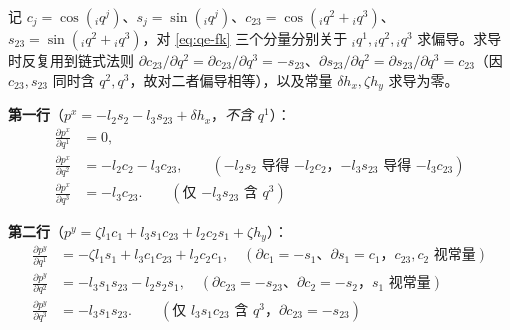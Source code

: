 \begin{example}\label{exam:qe-jacobian}
记 $c_j=\cos({}_iq^j)$、$s_j=\sin({}_iq^j)$、$c_{23}=\cos({}_iq^2+{}_iq^3)$、$s_{23}=\sin({}_iq^2+{}_iq^3)$，对 \cref{eq:qe-fk} 三个分量分别关于 ${}_iq^1,{}_iq^2,{}_iq^3$ 求偏导。求导时反复用到链式法则 $\partial c_{23}/\partial q^2=\partial c_{23}/\partial q^3=-s_{23}$、$\partial s_{23}/\partial q^2=\partial s_{23}/\partial q^3=c_{23}$（因 $c_{23},s_{23}$ 同时含 $q^2,q^3$，故对二者偏导相等），以及常量 $\delta h_x,\zeta h_y$ 求导为零。

\textbf{第一行}（$p^x=-l_2 s_2-l_3 s_{23}+\delta h_x$，\emph{不含} $q^1$）：
\begin{align*}
  \frac{\partial p^x}{\partial q^1}&=0,\\
  \frac{\partial p^x}{\partial q^2}&=-l_2 c_2-l_3 c_{23},\qquad(\text{$-l_2 s_2$ 导得 $-l_2c_2$，$-l_3 s_{23}$ 导得 $-l_3c_{23}$})\\
  \frac{\partial p^x}{\partial q^3}&=-l_3 c_{23}.\qquad(\text{仅 $-l_3 s_{23}$ 含 $q^3$})
\end{align*}

\textbf{第二行}（$p^y=\zeta l_1 c_1+l_3 s_1 c_{23}+l_2 c_2 s_1+\zeta h_y$）：
\begin{align*}
  \frac{\partial p^y}{\partial q^1}&=-\zeta l_1 s_1+l_3 c_1 c_{23}+l_2 c_2 c_1,
   \quad(\text{$\partial c_1=-s_1$、$\partial s_1=c_1$，$c_{23},c_2$ 视常量})\\
  \frac{\partial p^y}{\partial q^2}&=-l_3 s_1 s_{23}-l_2 s_2 s_1,
   \quad(\text{$\partial c_{23}=-s_{23}$、$\partial c_2=-s_2$，$s_1$ 视常量})\\
  \frac{\partial p^y}{\partial q^3}&=-l_3 s_1 s_{23}.\qquad(\text{仅 $l_3 s_1 c_{23}$ 含 $q^3$，$\partial c_{23}=-s_{23}$})
\end{align*}


\end{example}
